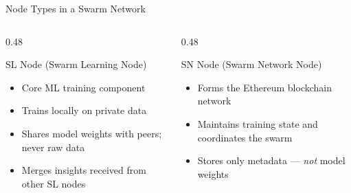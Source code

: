 \documentclass[aspectratio=169]{beamer}
\begin{document}
\begin{frame}{Node Types in a Swarm Network}
    \begin{columns}[T]
        \begin{column}{0.48\textwidth}
            \begin{block}{SL Node (Swarm Learning Node)}
                \begin{itemize}
                    \item Core ML training component
                    \item Trains locally on private data
                    \item Shares model weights with peers; never raw data
                    \item Merges insights received from other SL nodes
                \end{itemize}
            \end{block}
        \end{column}
        \begin{column}{0.48\textwidth}
            \begin{block}{SN Node (Swarm Network Node)}
                \begin{itemize}
                    \item Forms the Ethereum blockchain network
                    \item Maintains training state and coordinates the swarm
                    \item Stores only metadata — \textit{not} model weights
                \end{itemize}
            \end{block}
        \end{column}
    \end{columns}
\end{frame}
\end{document}
